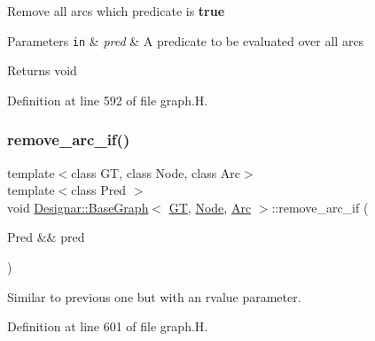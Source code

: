 Remove all arcs which predicate is {\bfseries true} 


\begin{DoxyParams}[1]{Parameters}
\mbox{\tt in}  & {\em pred} & A predicate to be evaluated over all arcs \\
\hline
\end{DoxyParams}
\begin{DoxyReturn}{Returns}
void 
\end{DoxyReturn}


Definition at line 592 of file graph.\+H.

\mbox{\label{class_designar_1_1_base_graph_a0e516bee6e0247de6bdd207de57caad6}} 
\subsubsection{\texorpdfstring{remove\+\_\+arc\+\_\+if()}{remove\_arc\_if()}\hspace{0.1cm}{\footnotesize\ttfamily [2/2]}}
{\footnotesize\ttfamily template$<$class GT, class Node, class Arc$>$ \\
template$<$class Pred $>$ \\
void \hyperlink{class_designar_1_1_base_graph}{Designar\+::\+Base\+Graph}$<$ \hyperlink{demo-buildgraph_8_c_a3001c40d2c31ca87ed96cd7d1334a55e}{GT}, \hyperlink{namespace_designar_a5af326c65aa2bd26b26c410f2030d09e}{Node}, \hyperlink{namespace_designar_a3f55fb5513d62ff47cbc8f72b8e95d6f}{Arc} $>$\+::remove\+\_\+arc\+\_\+if (\begin{DoxyParamCaption}\item[{Pred \&\&}]{pred }\end{DoxyParamCaption})\hspace{0.3cm}{\ttfamily [inline]}}



Similar to previous one but with an rvalue parameter. 



Definition at line 601 of file graph.\+H.

\mbox{\label{class_designar_1_1_base_graph_ab7c2c2129abb3200b854e23f34e513e8}} 
